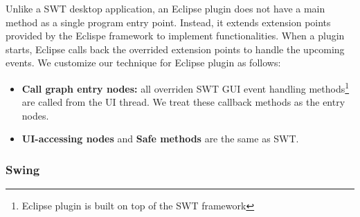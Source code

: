 Unlike a SWT desktop application, an Eclipse plugin does not
have a main method as a single program entry point. Instead, it extends
extension points provided by the Eclispe framework to implement
functionalities. When a plugin starts, Eclipse
calls back the overrided extension points to handle the
upcoming events. We customize our technique for Eclipse plugin as follows:


\begin{itemize}

\item \textbf{Call graph entry nodes: } all overriden SWT
GUI event handling methods\footnote{Eclipse plugin is built
on top of the SWT framework} are called from the UI thread.
We treat these callback methods as the entry nodes.



\item \textbf{UI-accessing nodes} and \textbf{Safe methods} are the same as SWT.

\end{itemize}

\subsubsection{Swing}


